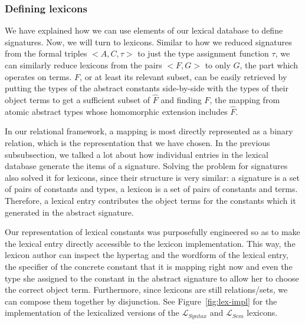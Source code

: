 \subsubsection{Defining lexicons}

We have explained how we can use elements of our lexical database to
define signatures. Now, we will turn to lexicons. Similar to how we
reduced signatures from the formal triples $\mathopen{<}A, C,
\tau\mathclose{>}$ to just the type assignment function $\tau$, we can
similarly reduce lexicons from the pairs $\mathopen{<}F, G\mathclose{>}$
to only $G$, the part which operates on terms. $F$, or at least its
relevant subset, can be easily retrieved by putting the types of the
abstract constants side-by-side with the types of their object terms to
get a sufficient subset of $\hat{F}$ and finding $F$, the mapping from
atomic abstract types whose homomorphic extension includes $\hat{F}$.

In our relational framework, a mapping is most directly represented as a
binary relation, which is the representation that we have chosen. In the
previous subsubsection, we talked a lot about how individual entries in
the lexical database generate the items of a signature. Solving the
problem for signatures also solved it for lexicons, since their
structure is very similar: a signature is a set of pairs of constants
and types, a lexicon is a set of pairs of constants and
terms. Therefore, a lexical entry contributes the object terms for the
constants which it generated in the abstract signature.

Our representation of lexical constants was purposefully engineered so
as to make the lexical entry directly accessible to the lexicon
implementation. This way, the lexicon author can inspect the hypertag
and the wordform of the lexical entry, the specifier of the concrete
constant that it is mapping right now and even the type she assigned to
the constant in the abstract signature to allow her to choose the
correct object term. Furthermore, since lexicons are still
relations/sets, we can compose them together by disjunction. See
Figure~\ref{fig:lex-impl} for the implementation of the lexicalized
versions of the $\mathcal{L}_{Syntax}$ and $\mathcal{L}_{Sem}$ lexicons.

